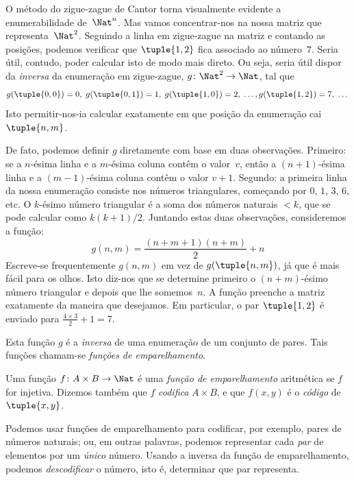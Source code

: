 \documentclass[../../../include/open-logic-section]{subfiles}
\begin{document}

\begin{explain}
O método do zigue-zague de Cantor torna visualmente evidente a
enumerabilidade de~$\Nat^n$. Mas vamos concentrar-nos na nossa matriz que
representa~$\Nat^2$. Seguindo a linha em zigue-zague na matriz e contando as
posições, podemos verificar que $\tuple{1,2}$ fica associado ao
número~$7$. Seria útil, contudo, poder calcular isto de modo mais direto. Ou
seja, seria útil dispor da \emph{inversa} da enumeração em zigue-zague,
$g\colon \Nat^2 \to \Nat$, tal que
\[
g(\tuple{0,0}) = 0, \;
g(\tuple{0,1}) = 1, \;
g(\tuple{1,0}) = 2, \; \dots,  
g(\tuple{1,2}) = 7, \; \dots
\]
Isto permitir-nos-ia calcular exatamente em que posição da enumeração cai
$\tuple{n, m}$.

De fato, podemos definir $g$ diretamente com base em duas observações.
Primeiro: se a $n$-ésima linha e a $m$-ésima coluna contêm o valor~$v$, então a
$(n+1)$-ésima linha e a $(m-1)$-ésima coluna contêm o valor $v + 1$. Segundo: a
primeira linha da nossa enumeração consiste nos números triangulares, começando
por $0$, $1$, $3$, $6$, etc. O $k$-ésimo número triangular é a soma dos números
naturais $< k$, que se pode calcular como $k(k+1)/2$. Juntando estas duas
observações, consideremos a função:
\[
  g(n,m) = \frac{(n+m+1)(n+m)}{2} + n
\]
Escreve-se frequentemente $g(n, m)$ em vez de $g(\tuple{n, m})$, já que é mais
fácil para os olhos. Isto diz-nos que se determine primeiro o $(n+m)$-ésimo número
triangular e depois que lhe somemos~$n$. A função preenche a matriz exatamente da maneira
que desejamos. Em particular, o par $\tuple{1, 2}$ é enviado para $\frac{4 \times 3}{2} +
1 = 7$.

Esta função $g$ é a \emph{inversa} de uma enumeração de um conjunto de pares.
Tais funções chamam-se \emph{funções de emparelhamento}.
\end{explain}

\begin{defn} 
  Uma função $f\colon A \times B \to \Nat$ é uma \emph{função de emparelhamento}
  aritmética se $f$ for injetiva. Dizemos também que $f$ \emph{codifica}
  $A \times B$, e que $f(x,y)$ é o \emph{código} de $\tuple{x,y}$.
\end{defn}

\begin{explain}
Podemos usar funções de emparelhamento para codificar, por exemplo, pares de
números naturais; ou, em outras palavras, podemos representar cada \emph{par} de
elementos por um \emph{único} número. Usando a inversa da função de
emparelhamento, podemos \emph{descodificar} o número, isto é, determinar que par
representa.
\end{explain}
\end{document}
